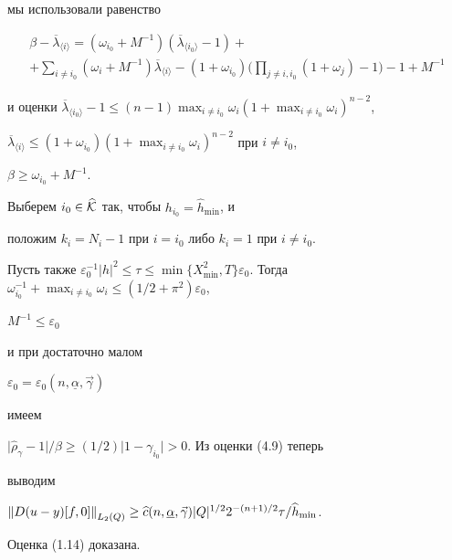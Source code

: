 мы использовали равенство 


\begin{gather*}


\beta-\overline\lambda_{\langle i \rangle}=


(\omega_{i_0}+M^{-1})(\overline\lambda_{\langle i_0\rangle}-1)+ \\


+\sum_{i\ne i_0}(\omega_i+M^{-1})


\overline\lambda_{\langle i \rangle}-(1+\omega_{i_0})


\biggl(\prod_{j\ne i,i_0}(1+\omega_j)-1\biggr)-1+M^{-1} 


\end{gather*}


и оценки $\overline\lambda_{\langle i_0\rangle}-1\le (n-1){\max}_{i\ne i_0}


\omega_i(1+{\max}_{i\ne i_0}\omega_i)^{n-2}$,


$\overline\lambda_{\langle i\rangle}\le(1+\omega_{i_0})


(1+{\max}_{i\ne i_0}\omega_i)^{n-2}$ при $i\ne i_0$,


$\beta\ge\omega_{i_0}+M^{-1}$.





Выберем $i_0\in\widehat{\cal K}$ так, чтобы $h_{i_0}=\widehat h_{\min}$, и


положим $k_i=N_i-1$ при $i=i_0$ либо $k_i=1$ при $i\ne i_0$.


Пусть также $\varepsilon_0^{-1}\vert h\vert^2\le\tau\le


\min\{X_{\min}^2,T\}\varepsilon_0$. Тогда $\omega_{i_0}^{-1}+


{\max}_{i\ne i_0}\omega_i\le (1/2+\pi^2)\varepsilon_0$, 


$M^{-1}\le\varepsilon_0$


и при достаточно малом 


$\varepsilon_0=\varepsilon_0(n,\underline\alpha,\Vec\gamma)$ 


имеем 


$\vert\widehat\rho_\gamma-1\vert/\beta


\ge (1/2)\vert 1-\gamma_{i_0}\vert>0$. Из оценки (4.9) теперь


выводим


${\ver D(u-y)[f,0]\ver}_{L_2(Q)}\ge \widehat c(n,\underline\alpha,


\Vec\gamma)\vert Q\vert^{1/2}2^{-(n+1)/2}\tau/\widehat h_{\min}$.


Оценка (1.14) доказана.





